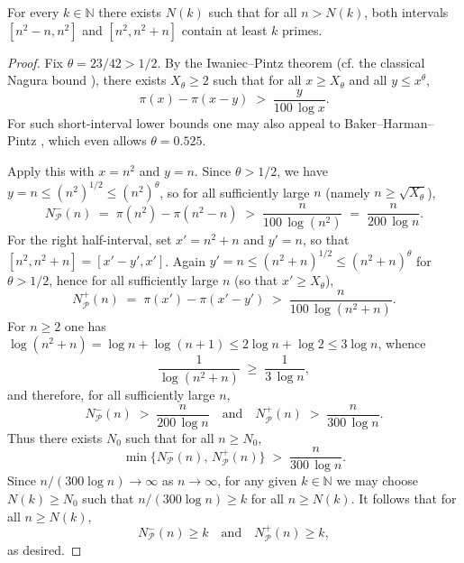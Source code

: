 \begin{theorem}\label{thm:k_fold_oppermann_for_primes}
For every $k\in\mathbb{N}$ there exists $N(k)$ such that for all $n>N(k)$, both intervals $[n^2-n,n^2]$ and $[n^2,n^2+n]$ contain at least $k$ primes.
\end{theorem}

\begin{proof}
Fix $\theta=23/42>1/2$. By the Iwaniec--Pintz theorem (cf. the classical Nagura bound \cite{Nagura1952}), there exists $X_\theta\ge 2$ such that for all $x\ge X_\theta$ and all $y\le x^{\theta}$,
\[
\pi(x)-\pi(x-y)\;>\;\frac{y}{100\,\log x}.
\]
For such short-interval lower bounds one may also appeal to Baker--Harman--Pintz \cite{BHP2001}, which even allows $\theta=0.525$.

Apply this with $x=n^2$ and $y=n$. Since $\theta>1/2$, we have $y=n\le (n^2)^{1/2}\le (n^2)^{\theta}$, so for all sufficiently large $n$ (namely $n\ge \sqrt{X_\theta}$),
\[
N^{-}_{\mathcal P}(n)
\;=\;\pi(n^2)-\pi(n^2-n)
\;>\;\frac{n}{100\,\log(n^2)}
\;=\;\frac{n}{200\,\log n}.
\]
For the right half-interval, set $x'=n^2+n$ and $y'=n$, so that $[n^2,n^2+n]=[x'-y',x']$. Again $y'=n\le (n^2+n)^{1/2}\le (n^2+n)^{\theta}$ for $\theta>1/2$, hence for all sufficiently large $n$ (so that $x'\ge X_\theta$),
\[
N^{+}_{\mathcal P}(n)
\;=\;\pi(x')-\pi(x'-y')
\;>\;\frac{n}{100\,\log(n^2+n)}.
\]
For $n\ge 2$ one has $\log(n^2+n)=\log n+\log(n+1)\le 2\log n+\log 2\le 3\log n$, whence
\[
\frac{1}{\log(n^2+n)}\;\ge\;\frac{1}{3\,\log n},
\]
and therefore, for all sufficiently large $n$,
\[
N^{-}_{\mathcal P}(n)\;>\;\frac{n}{200\,\log n}
\quad\text{and}\quad
N^{+}_{\mathcal P}(n)\;>\;\frac{n}{300\,\log n}.
\]
Thus there exists $N_0$ such that for all $n\ge N_0$,
\[
\min\bigl\{N^{-}_{\mathcal P}(n),\,N^{+}_{\mathcal P}(n)\bigr\}
\;>\;\frac{n}{300\,\log n}.
\]
Since $n/(300\log n)\to\infty$ as $n\to\infty$, for any given $k\in\mathbb{N}$ we may choose $N(k)\ge N_0$ such that $n/(300\log n)\ge k$ for all $n\ge N(k)$. It follows that for all $n\ge N(k)$,
\[
N^{-}_{\mathcal P}(n)\ge k\quad\text{and}\quad N^{+}_{\mathcal P}(n)\ge k,
\]
as desired.
\end{proof}
